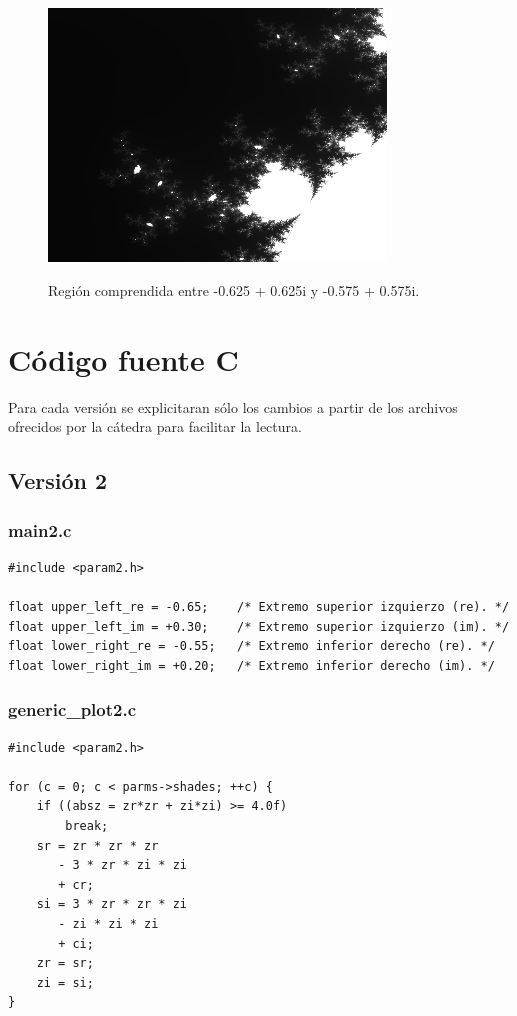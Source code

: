 \documentclass[a4paper,10pt]{article}
\begin{document}
\begin{figure}[H]
\begin{center}
\includegraphics[width=0.8\textwidth]{./zoom.png}
\label{fig:zoom}
\caption{Regi\'on comprendida entre -0.625 + 0.625i y -0.575 + 0.575i.}
\end{center}
\end{figure}


\section{C\'odigo fuente C}
Para cada versión se explicitaran sólo los cambios a partir de los archivos ofrecidos por la cátedra para facilitar la lectura.

\subsection{Versión 2}
\subsubsection{main2.c}
\begin{verbatim}
#include <param2.h>

float upper_left_re = -0.65;	/* Extremo superior izquierzo (re). */
float upper_left_im = +0.30;	/* Extremo superior izquierzo (im). */
float lower_right_re = -0.55;	/* Extremo inferior derecho (re). */
float lower_right_im = +0.20;	/* Extremo inferior derecho (im). */
\end{verbatim}

\subsubsection{generic\_plot2.c}
\begin{verbatim}
#include <param2.h>

for (c = 0; c < parms->shades; ++c) {
	if ((absz = zr*zr + zi*zi) >= 4.0f)
		break;
	sr = zr * zr * zr
	   - 3 * zr * zi * zi
	   + cr;
	si = 3 * zr * zr * zi
	   - zi * zi * zi
	   + ci;
	zr = sr;
	zi = si;
}
\end{verbatim}
\end{document}
